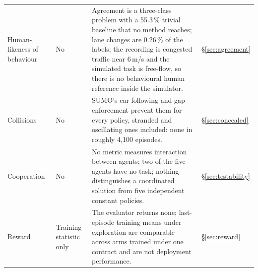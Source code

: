 \begin{table}[!t]
\begin{tabular}{@{}>{\raggedright\arraybackslash}p{}>{\raggedright\arraybackslash}p{}>{\raggedright\arraybackslash}p{}>{\raggedright\arraybackslash}p{}@{}}
Human-likeness of behaviour & No & Agreement is a three-class problem with a 55.3\,\% trivial baseline that no method reaches; lane changes are 0.26\,\% of the labels; the recording is congested traffic near 6\,m/s and the simulated task is free-flow, so there is no behavioural human reference inside the simulator. & \S\ref{sec:agreement} \\
Collisions & No & SUMO's car-following and gap enforcement prevent them for every policy, stranded and oscillating ones included: none in roughly 4{,}100 episodes. & \S\ref{sec:concealed} \\
Cooperation & No & No metric measures interaction between agents; two of the five agents have no task; nothing distinguishes a coordinated solution from five independent constant policies. & \S\ref{sec:testability} \\
Reward & Training statistic only & The evaluator returns none; last-episode training means under exploration are comparable across arms trained under one contract and are not deployment performance. & \S\ref{sec:reward} \\
\bottomrule
\end{tabular}
\end{table}
